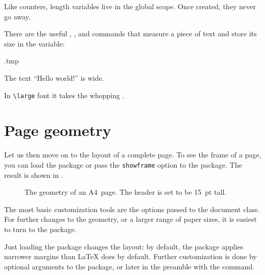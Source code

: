 \begin{technote}
Like counters, length variables live in the global scope.
Once created, they never go away.
\end{technote}

There are the useful , , and 
commands that measure a piece of text and store its size in the variable:
%
\begin{VerbatimOut}{\jobname.tmp}
\settowidth{}

The text ``Hello world!''
is {\the\Mylen} wide.

\settowidth{}

In \verb|\large| font it takes
the whopping \the\Mylen.
\end{VerbatimOut}
\ShowExample



%
%
%
\section{Page geometry}

Let us then move on to the layout of a complete page.
To see the frame of a page, you can load the  package
or pass the \verb|showframe| option to the  package.
The result is shown in .

\begin{figure}
\centering
\setlength\fboxsep{0pt}
\caption{The geometry of an A4~page. The header is set to be 15~pt tall.}
\label{fig:page geometry}
\end{figure}

The most basic customization tools are the options passed to the document class.
For further changes to the geometry, or a larger range of paper sizes,
it is easiest to turn to the  package.

Just loading the  package changes the layout:
by default, the package applies narrower margins than \LaTeX{} does by default.
Further customization is done by optional arguments to the package,
or later in the preamble with the  command.

